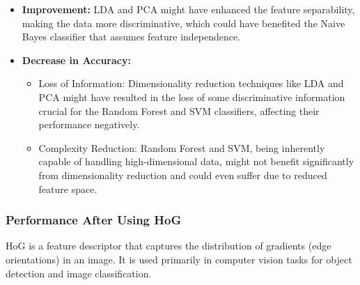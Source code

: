 \documentclass[a4paper]{article}
\theoremstyle{plain}
\theoremstyle{definition}
\begin{document}
\begin{enumerate}
\begin{itemize}
    \item \textbf{Improvement:} LDA and PCA might have enhanced the feature separability, making the data more discriminative, which could have benefited the Naive Bayes classifier that assumes feature independence.
    \item \textbf{Decrease in Accuracy:}
    \begin{itemize}
        \item Loss of Information: Dimensionality reduction techniques like LDA and PCA might have resulted in the loss of some discriminative information crucial for the Random Forest and SVM classifiers, affecting their performance negatively.
        \item Complexity Reduction: Random Forest and SVM, being inherently capable of handling high-dimensional data, might not benefit significantly from dimensionality reduction and could even suffer due to reduced feature space.
    \end{itemize}

\end{itemize}
\vspace{0.5cm}
\subsubsection{Performance After Using HoG }
HoG is a feature descriptor that captures the distribution of gradients (edge orientations) in an image. It is used primarily in computer vision tasks for object detection and image classification.\\


\end{enumerate}
\end{document}
